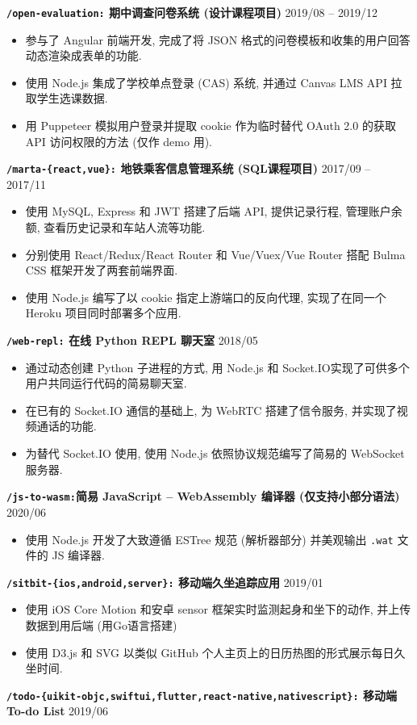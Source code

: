 \documentclass[10 pt]{article}
\begin{document}
\textbf{\texttt{/open-evaluation:} 期中调查问卷系统 (设计课程项目)} \hfill 2019/08 -- 2019/12
\begin{itemize}
\item 参与了 Angular 前端开发, 完成了将 JSON 格式的问卷模板和收集的用户回答动态渲染成表单的功能.
\item 使用 Node.js 集成了学校单点登录 (CAS) 系统, 并通过 Canvas LMS API 拉取学生选课数据.
\item 用 Puppeteer 模拟用户登录并提取 cookie 作为临时替代 OAuth 2.0 的获取 API 访问权限的方法 (仅作 demo 用).
\end{itemize}

\textbf{\texttt{/marta-\{react,vue\}:} 地铁乘客信息管理系统 (SQL课程项目) } \hfill 2017/09 -- 2017/11
\begin{itemize}
\item 使用 MySQL, Express 和 JWT 搭建了后端 API, 提供记录行程, 管理账户余额, 查看历史记录和车站人流等功能.
\item 分别使用 React/Redux/React Router 和 Vue/Vuex/Vue Router 搭配 Bulma  CSS 框架开发了两套前端界面.
\item 使用 Node.js 编写了以 cookie 指定上游端口的反向代理, 实现了在同一个 Heroku 项目同时部署多个应用.
\end{itemize}

\textbf{\texttt{/web-repl:} 在线 Python REPL 聊天室}  \hfill 2018/05 
\begin{itemize}
\item 通过动态创建 Python 子进程的方式, 用 Node.js 和 Socket.IO实现了可供多个用户共同运行代码的简易聊天室.
\item 在已有的 Socket.IO 通信的基础上, 为 WebRTC 搭建了信令服务, 并实现了视频通话的功能.
\item 为替代 Socket.IO 使用, 使用 Node.js 依照协议规范编写了简易的 WebSocket 服务器.
\end{itemize}

\textbf{\texttt{/js-to-wasm:}简易 JavaScript -- WebAssembly 编译器 (仅支持小部分语法)} \hfill 2020/06
\begin{itemize}
\item 使用 Node.js 开发了大致遵循 ESTree 规范 (解析器部分) 并美观输出 \texttt{.wat} 文件的 JS 编译器.
\end{itemize}

\textbf{\texttt{/sitbit-\{ios,android,server\}:} 移动端久坐追踪应用} \hfill 2019/01
\begin{itemize}
\item 使用 iOS Core Motion 和安卓 sensor 框架实时监测起身和坐下的动作, 并上传数据到用后端 (用Go语言搭建)
\item 使用 D3.js 和 SVG 以类似 GitHub 个人主页上的日历热图的形式展示每日久坐时间.
\end{itemize}

\textbf{\texttt{/todo-\{uikit-objc,swiftui,flutter,react-native,nativescript\}:} 移动端To-do List} \hfill 2019/06
\end{document}
